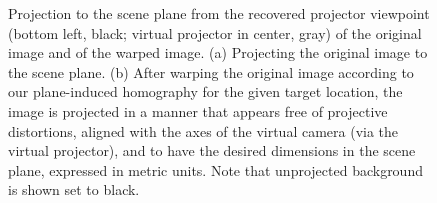 \documentclass[review]{elsarticle}
\begin{document}
{\begin{figure}
    \centering
    \qquad
    \caption{Projection to the scene plane from the recovered projector viewpoint (bottom left, black; virtual projector in center, gray) of the original image and of the warped image. (a) Projecting the original image to the scene plane. (b) After warping the original image according to our plane-induced homography for the given target location, the image is projected in a manner that appears free of projective distortions, aligned with the axes of the virtual camera (via the virtual projector), and to have the desired dimensions in the scene plane, expressed in metric units. Note that unprojected background is shown set to black.}
    \label{fig:warp}
\end{figure}

}
\end{document}
